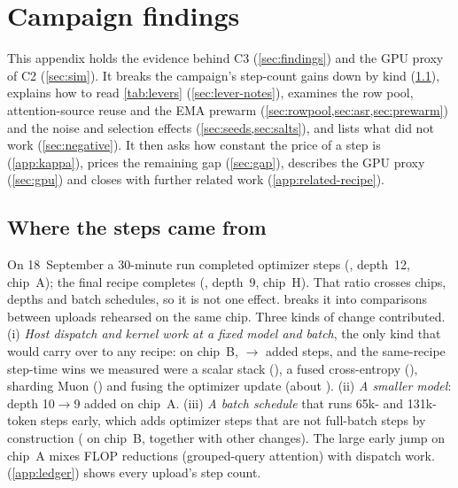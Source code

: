 \section{Campaign findings}
\label{app:findings}

This appendix holds the evidence behind C3 (\cref{sec:findings}) and the GPU proxy of C2 (\cref{sec:sim}). It
breaks the campaign's step-count gains down by kind (\cref{sec:steps}), explains how to read
\cref{tab:levers} (\cref{sec:lever-notes}), examines the row pool, attention-source reuse and the EMA prewarm
(\cref{sec:rowpool,sec:asr,sec:prewarm}) and the noise and selection effects (\cref{sec:seeds,sec:salts}), and
lists what did not work (\cref{sec:negative}). It then asks how constant the price of a step is (\cref{app:kappa}),
prices the remaining gap (\cref{sec:gap}), describes the GPU proxy (\cref{sec:gpu}) and closes with further related
work (\cref{app:related-recipe}).

\subsection{Where the steps came from}
\label{sec:steps}

On 18~September a 30-minute run completed  optimizer steps (, depth~12, chip~A);
the final recipe completes  (, depth~9, chip~H). That ratio crosses chips, depths and batch
schedules, so it is not one effect.  breaks it into comparisons between uploads rehearsed on the
same chip. Three kinds of change contributed. (i) \emph{Host dispatch and kernel work at a fixed model and batch},
the only kind that would carry over to any recipe: on chip~B, $\to$ added  steps,
and the same-recipe step-time wins we measured were a scalar stack (\docnum{}), a fused cross-entropy
(\docnum{}), sharding Muon (\docnum{}) and fusing the optimizer update (about
\docnum{}). (ii) \emph{A smaller model}: depth 10$\to$9 added  on chip~A.
(iii) \emph{A batch schedule} that runs 65k- and 131k-token steps early, which adds optimizer steps that are not
full-batch steps by construction ( on chip~B, together with other changes). The large early jump on
chip~A mixes FLOP reductions (grouped-query attention) with dispatch work.  (\cref{app:ledger}) shows
every upload's step count.

